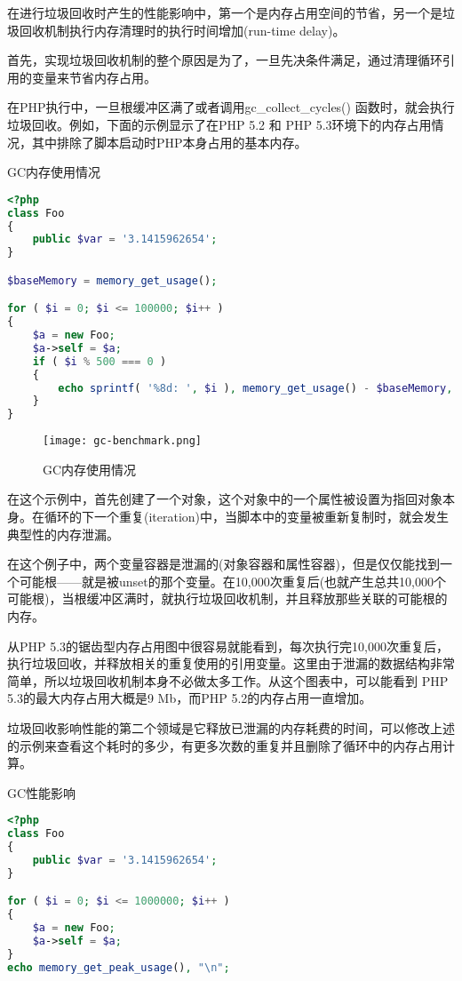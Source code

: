 在进行垃圾回收时产生的性能影响中，第一个是内存占用空间的节省，另一个是垃圾回收机制执行内存清理时的执行时间增加(run-time delay)。

首先，实现垃圾回收机制的整个原因是为了，一旦先决条件满足，通过清理循环引用的变量来节省内存占用。

在PHP执行中，一旦根缓冲区满了或者调用gc\_collect\_cycles() 函数时，就会执行垃圾回收。例如，下面的示例显示了在PHP 5.2 和 PHP 5.3环境下的内存占用情况，其中排除了脚本启动时PHP本身占用的基本内存。


\begin{example}
GC内存使用情况
\begin{lstlisting}[language=PHP]
<?php
class Foo
{
    public $var = '3.1415962654';
}

$baseMemory = memory_get_usage();

for ( $i = 0; $i <= 100000; $i++ )
{
    $a = new Foo;
    $a->self = $a;
    if ( $i % 500 === 0 )
    {
        echo sprintf( '%8d: ', $i ), memory_get_usage() - $baseMemory, "\n";
    }
}
\end{lstlisting}
\end{example}


\begin{figure}[htbp]
\centering
\texttt{[image: gc-benchmark.png]}
\caption{GC内存使用情况}
\end{figure}

在这个示例中，首先创建了一个对象，这个对象中的一个属性被设置为指回对象本身。在循环的下一个重复(iteration)中，当脚本中的变量被重新复制时，就会发生典型性的内存泄漏。

在这个例子中，两个变量容器是泄漏的(对象容器和属性容器)，但是仅仅能找到一个可能根——就是被unset的那个变量。在10,000次重复后(也就产生总共10,000个可能根)，当根缓冲区满时，就执行垃圾回收机制，并且释放那些关联的可能根的内存。

从PHP 5.3的锯齿型内存占用图中很容易就能看到，每次执行完10,000次重复后，执行垃圾回收，并释放相关的重复使用的引用变量。这里由于泄漏的数据结构非常简单，所以垃圾回收机制本身不必做太多工作。从这个图表中，可以能看到 PHP 5.3的最大内存占用大概是9 Mb，而PHP 5.2的内存占用一直增加。

垃圾回收影响性能的第二个领域是它释放已泄漏的内存耗费的时间，可以修改上述的示例来查看这个耗时的多少，有更多次数的重复并且删除了循环中的内存占用计算。


\begin{example}
GC性能影响
\begin{lstlisting}[language=PHP]
<?php
class Foo
{
    public $var = '3.1415962654';
}

for ( $i = 0; $i <= 1000000; $i++ )
{
    $a = new Foo;
    $a->self = $a;
}
echo memory_get_peak_usage(), "\n";
\end{lstlisting}
\end{example}

